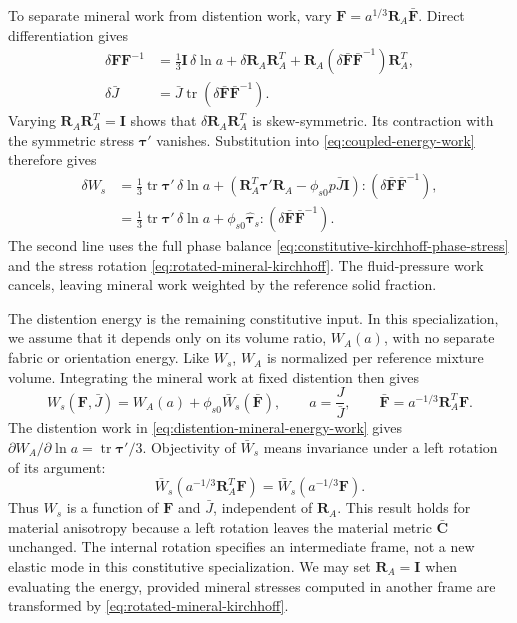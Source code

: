 \documentclass[11pt]{article}
\newcommand{\tr}{\operatorname{tr}}
\begin{document}
To separate mineral work from distention work, vary
\(\mathbf F=a^{1/3}\mathbf R_A\bar{\mathbf F}\). Direct differentiation
gives
\begin{align}
 \delta\mathbf F\mathbf F^{-1}
 &=\frac13\mathbf I\,\delta\ln a
   +\delta\mathbf R_A\mathbf R_A^T
   +\mathbf R_A(\delta\bar{\mathbf F}\bar{\mathbf F}^{-1})\mathbf R_A^T,
 \label{eq:spherical-distention-virtual-deformation}\\
 \delta\bar J
 &=\bar J\tr(\delta\bar{\mathbf F}\bar{\mathbf F}^{-1}).
 \label{eq:mineral-volume-variation}
\end{align}
Varying \(\mathbf R_A\mathbf R_A^T=\mathbf I\) shows that
\(\delta\mathbf R_A\mathbf R_A^T\) is skew-symmetric. Its contraction with the
symmetric stress \(\mathbf\tau'\) vanishes. Substitution into
\eqref{eq:coupled-energy-work} therefore gives
\begin{align}
 \delta W_s
 &=\frac13\tr\mathbf\tau'\,\delta\ln a
 +\left(\mathbf R_A^T\mathbf\tau'\mathbf R_A
                 -\phi_{s0}p\bar J\mathbf I\right):
       (\delta\bar{\mathbf F}\bar{\mathbf F}^{-1}),
 \label{eq:phase-work-substitution}\\
 &=\frac13\tr\mathbf\tau'\,\delta\ln a
 +\phi_{s0}\widehat{\mathbf\tau}_s:
       (\delta\bar{\mathbf F}\bar{\mathbf F}^{-1}).
 \label{eq:distention-mineral-energy-work}
\end{align}
The second line uses the full phase balance
\eqref{eq:constitutive-kirchhoff-phase-stress} and the stress rotation
\eqref{eq:rotated-mineral-kirchhoff}. The fluid-pressure work cancels,
leaving mineral work weighted by the reference solid fraction.

The distention energy is the remaining constitutive input. In this
specialization, we assume that it depends only on its volume ratio,
\(W_A(a)\), with no separate fabric or
orientation energy. Like \(W_s\), \(W_A\) is normalized per reference
mixture volume. Integrating the mineral work at fixed distention then
gives
\begin{equation}
 W_s(\mathbf F,\bar J)=W_A(a)+\phi_{s0}\bar W_s(\bar{\mathbf F}),
 \qquad a=\frac J{\bar J},\qquad
 \bar{\mathbf F}=a^{-1/3}\mathbf R_A^T\mathbf F.
 \label{eq:equivalent-mixture-mineral-energy}
\end{equation}
The distention work in \eqref{eq:distention-mineral-energy-work} gives
\(\partial W_A/\partial\ln a=\tr\mathbf\tau'/3\). Objectivity of
\(\bar W_s\) means invariance under a left rotation of its argument:
\begin{equation}
 \bar W_s(a^{-1/3}\mathbf R_A^T\mathbf F)
 =\bar W_s(a^{-1/3}\mathbf F).
 \label{eq:spherical-objective-energy}
\end{equation}
Thus \(W_s\) is a function of \(\mathbf F\) and \(\bar J\), independent
of \(\mathbf R_A\). This result holds for material anisotropy because a
left rotation leaves the material metric \(\bar{\mathbf C}\) unchanged.
The internal rotation specifies an intermediate frame, not a new elastic
mode in this constitutive specialization. We may set \(\mathbf R_A=\mathbf I\)
when evaluating the energy, provided mineral stresses computed in another
frame are transformed by \eqref{eq:rotated-mineral-kirchhoff}.
\end{document}
